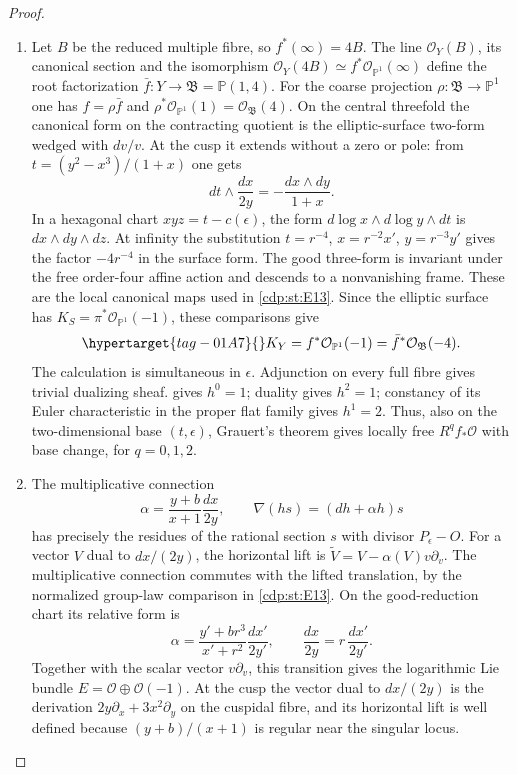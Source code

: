 \begin{proof}
\begin{enumerate}[label=\arabic*.,leftmargin=*]
\item Let $B$ be the reduced multiple fibre, so $f^*(\infty)=4B$.
The line $\mathcal O_Y(B)$, its canonical section and the isomorphism
$\mathcal O_Y(4B)\simeq f^*\mathcal O_{\mathbb P^1}(\infty)$ define
the root factorization $\bar f:Y\to\mathfrak B=\mathbb P(1,4)$.
For the coarse projection $\rho:\mathfrak B\to\mathbb P^1$ one has
$f=\rho\bar f$ and
$\rho^*\mathcal O_{\mathbb P^1}(1)=\mathcal O_{\mathfrak B}(4)$.
On the central threefold the
canonical form on the contracting quotient is the elliptic-surface
two-form wedged with $dv/v$. At the cusp it extends without a zero
or pole: from $t=(y^2-x^3)/(1+x)$ one gets
\[
 dt\wedge\frac{dx}{2y}=-\frac{dx\wedge dy}{1+x}.
\]
In a hexagonal chart $xyz=t-c(\epsilon)$, the form
$d\log x\wedge d\log y\wedge dt$ is $dx\wedge dy\wedge dz$.
At infinity the substitution
$t=r^{-4}$, $x=r^{-2}x'$, $y=r^{-3}y'$ gives the factor $-4r^{-4}$
in the surface form. The good three-form is invariant under the
free order-four affine action and descends to a nonvanishing frame.
These are the local canonical maps used in \ref{cdp:st:E13}.
Since the elliptic surface has
$K_S=\pi^*\mathcal O_{\mathbb P^1}(-1)$, these comparisons give
\begin{equation}\hypertarget{tag-01A7}{}\label{cdp:eq:E14-canonical}
 K_Y=f^*\mathcal O_{\mathbb P^1}(-1)
     =\bar f^*\mathcal O_{\mathfrak B}(-4).
\end{equation}
The calculation is simultaneous in $\epsilon$. Adjunction on every
full fibre gives trivial dualizing sheaf. \cite[Theorem~2.2, pp.~4--5]{Viaclovsky2026Combs} gives $h^0=1$;
duality gives $h^2=1$; constancy of its Euler characteristic in the
proper flat family gives $h^1=2$. Thus, also on the two-dimensional
base $(t,\epsilon)$, Grauert's theorem gives locally free $R^qf_*\mathcal O$
with base change, for $q=0,1,2$.

\item The multiplicative connection
\[
 \alpha=\frac{y+b}{x+1}\frac{dx}{2y},\qquad
 \nabla(hs)=(dh+\alpha h)s
\]
has precisely the residues of the rational section $s$ with divisor
$P_\epsilon-O$. For a vector $V$ dual to $dx/(2y)$, the horizontal lift is
$\widetilde V=V-\alpha(V)v\partial_v$. The multiplicative
connection commutes with the lifted translation, by the normalized
group-law comparison in \ref{cdp:st:E13}. On the good-reduction
chart its relative form is
\[
 \alpha=\frac{y'+br^3}{x'+r^2}\frac{dx'}{2y'},\qquad
 \frac{dx}{2y}=r\,\frac{dx'}{2y'}.
\]
Together with the scalar vector $v\partial_v$, this transition gives
the logarithmic Lie bundle $E=\mathcal O\oplus\mathcal O(-1)$. At the cusp the vector dual to $dx/(2y)$ is the derivation
$2y\partial_x+3x^2\partial_y$ on the cuspidal fibre, and its
horizontal lift is well defined because
$(y+b)/(x+1)$ is regular near the singular locus.


\end{enumerate}
\end{proof}
